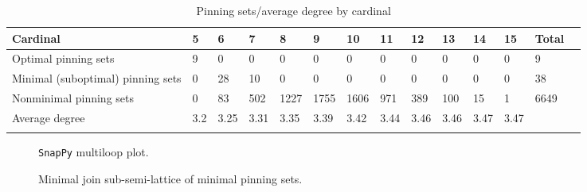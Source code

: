 \documentclass{article}%
\begin{document}
\begin{table}[ht]
	\caption{Pinning sets/average degree by cardinal}
	\centering
	\renewcommand{\arraystretch}{1.5}
	\begin{tabularx}{\textwidth}{lXXXXXXXXXXXXX}
		\toprule
			Cardinal & 5 & 6 & 7 & 8 & 9 & 10 & 11 & 12 & 13 & 14 & 15 & Total\\
			\hline
			Optimal pinning sets & 9 & 0 & 0 & 0 & 0 & 0 & 0 & 0 & 0 & 0 & 0 & 9 \\
			Minimal (suboptimal) pinning sets & 0 & 28 & 10 & 0 & 0 & 0 & 0 & 0 & 0 & 0 & 0 & 38 \\
			Nonminimal pinning sets & 0 & 83 & 502 & 1227 & 1755 & 1606 & 971 & 389 & 100 & 15 & 1 & 6649 \\
			Average degree & 3.2 & 3.25 & 3.31 & 3.35 & 3.39 & 3.42 & 3.44 & 3.46 & 3.46 & 3.47 & 3.47 &  \\
		\bottomrule \\ 
	\end{tabularx}
\end{table}

\begin{multicols}{2}
\begin{figure}[H]
\centering

\caption{\texttt{SnapPy} multiloop plot.}
\label{fig:tex/img/[[7, 26, 8, 1], [17, 6, 18, 7], [14, 25, 15, 26], [8, 15, 9, 16], [1, 16, 2, 17], [12, 5, 13, 6], [18, 13, 19, 14], [19, 24, 20, 25], [9, 20, 10, 21], [2, 21, 3, 22], [22, 11, 23, 12], [23, 4, 24, 5],.svg}
\end{figure}
\columnbreak

\begin{figure}[H]
\centering
\scalebox{0.8}{}
\caption{Minimal join sub-semi-lattice of minimal pinning sets.}
\label{fig:tex/img/[[7, 26, 8, 1], [17, 6, 18, 7], [14, 25, 15, 26], [8, 15, 9, 16], [1, 16, 2, 17], [12, 5, 13, 6], [18, 13, 19, 14], [19, 24, 20, 25], [9, 20, 10, 21], [2, 21, 3, 22], [22, 11, 23, 12], [23, 4, 24, 5],.pgf}
\end{figure}
\end{multicols}
\end{document}
